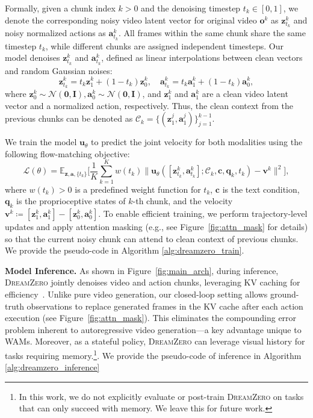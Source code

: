 \documentclass[10pt,logo,copyright]{nvidiatechreport}
\newcommand{\ourmethod}{\mbox{\textsc{DreamZero}}\xspace}
\begin{document}
Formally, given a chunk index $k>0$ and the denoising timestep $t_{k} \in [0,1]$, we denote the corresponding noisy video latent vector for original video $\mathbf{o}^{k}$ as $\mathbf{z}_{t_{k}}^{k}$ and noisy normalized actions as $\mathbf{a}_{t_{k}}^{k}$. 
All frames within the same chunk share the same timestep $t_{k}$, while different chunks are assigned independent timesteps.
Our model denoises 
$\mathbf{z}_{t_{k}}^{k}$ and $\mathbf{a}_{t_{k}}^{k}$, defined as linear interpolations between clean vectors and random Gaussian noises:
\begin{equation}
        \mathbf{z}_{t_{k}}^{k} = t_k \mathbf{z}_{1}^{k} + (1 - t_k) \mathbf{z}_{0}^{k},\quad
        \mathbf{a}_{t_{k}}^{k} = t_k \mathbf{a}_{1}^{k} + (1 - t_k) \mathbf{a}_{0}^{k},
\end{equation}
where $\mathbf{z}_{0}^{k} \sim \mathcal{N}(\mathbf{0},\mathbf{I}), \mathbf{a}_{0}^{k} \sim \mathcal{N}(\mathbf{0},\mathbf{I})$, and $\mathbf{z}_{1}^{k}$ and $\mathbf{a}_{1}^{k}$ are a clean video latent vector and a normalized action, respectively.
Thus, the clean context from the previous chunks can be denoted as $\mathcal{C}_{k} = \{(\mathbf{z}_{1}^{j}, \mathbf{a}_{1}^{j})\}_{j=1}^{k-1}$. 

We train the model $\mathbf{u}_{\theta}$ to predict the joint velocity for both modalities using the following flow-matching objective:
\begin{equation}
    \mathcal{L}(\theta) = \mathbb{E}_{\mathbf{z}, \mathbf{a}, \{t_k\}} \Bigg[\frac{1}{K} \sum_{k=1}^{K} w(t_k) \big\lVert \mathbf{u}_{\theta}([\mathbf{z}_{t_k}^{k}, \mathbf{a}_{t_k}^{k}];\mathcal{C}_{k}, \mathbf{c}, \mathbf{q}_{k}, t_{k}) - \mathbf{v}^{k} \big\rVert^2\Bigg],
\end{equation}
where $w(t_k)>0$ is a predefined weight function for $t_k$, $\mathbf{c}$ is the text condition, $\mathbf{q}_{k}$ is the proprioceptive states of $k$-th chunk, and the velocity $\mathbf{v}^{k} \coloneqq [\mathbf{z}_{1}^{k}, \mathbf{a}_{1}^{k}] - [\mathbf{z}_{0}^{k}, \mathbf{a}_{0}^{k}]$. To enable efficient training, we perform trajectory-level updates and apply attention masking (e.g., see Figure~\ref{fig:attn_mask} for details) so that the current noisy chunk can attend to clean context of previous chunks. We provide the pseudo-code in Algorithm \ref{alg:dreamzero_train}.


\textbf{Model Inference.} As shown in Figure~\ref{fig:main_arch}, during inference, \ourmethod jointly denoises video and action chunks, leveraging KV caching for efficiency~\citep{huang2025self, teng2025magi, yin2025slow}. Unlike pure video generation, our closed-loop setting allows ground-truth observations to replace generated frames in the KV cache after each action execution (see Figure~\ref{fig:attn_mask}). This eliminates the compounding error problem inherent to autoregressive video generation—a key advantage unique to WAMs. Moreover, as a stateful policy, \ourmethod can leverage visual history for tasks requiring memory.\footnote{In this work, we do not explicitly evaluate or post-train \ourmethod on tasks that can only succeed with memory. We leave this for future work.}. We provide the pseudo-code of inference in Algorithm \ref{alg:dreamzero_inference}

\end{document}
